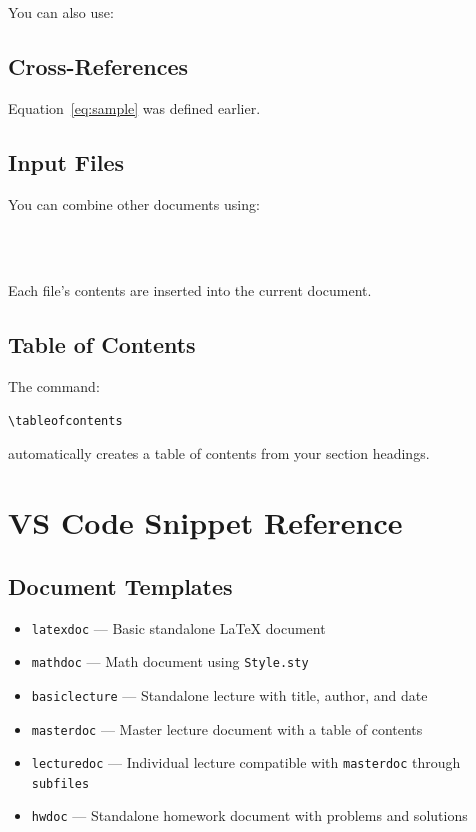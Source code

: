 \documentclass{article}
\begin{document}
You can also use:


\subsection{Cross-References}

Equation~\ref{eq:sample} was defined earlier.

\subsection{Input Files}

You can combine other documents using:

\begin{verbatim}



\end{verbatim}

Each file's contents are inserted into the
current document.

\subsection{Table of Contents}

The command:

\begin{verbatim}
\tableofcontents
\end{verbatim}

automatically creates a table of contents
from your section headings.


\section{VS Code Snippet Reference}

\subsection{Document Templates}

\begin{itemize}
    \item \texttt{latexdoc} --- Basic standalone LaTeX document
    \item \texttt{mathdoc} --- Math document using \texttt{Style.sty}
    \item \texttt{basiclecture} --- Standalone lecture with title, author, and date
    \item \texttt{masterdoc} --- Master lecture document with a table of contents
    \item \texttt{lecturedoc} --- Individual lecture compatible with \texttt{masterdoc} through \texttt{subfiles}
    \item \texttt{hwdoc} --- Standalone homework document with problems and solutions
\end{itemize}
\end{document}
